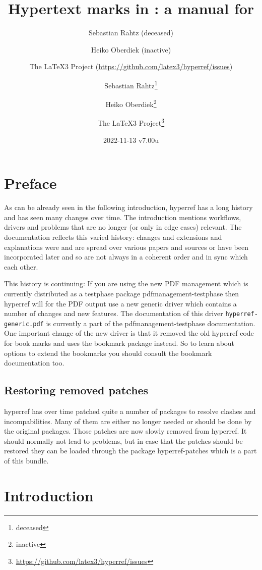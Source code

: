 \documentclass{article}
\author{Sebastian Rahtz (deceased)\and
       Heiko Oberdiek (inactive)\and
       The \LaTeX3 Project (\url{https://github.com/latex3/hyperref/issues})}
\author{Sebastian Rahtz\thanks{deceased}\and
       Heiko Oberdiek\thanks{inactive}\and
       The \LaTeX3 Project\thanks{\url{https://github.com/latex3/hyperref/issues}}}
\title{Hypertext marks in \hologo{LaTeX}: a manual for \xpackage{hyperref}}
\date{2022-11-13 v7.00u}
\newcommand*{\xpackage}[1]{\textsf{#1}}
\begin{document}
\thispagestyle{empty}
\maketitle
\tableofcontents
\setcounter{tocdepth}{2}%

\section{Preface}
As can be already seen in the following introduction, \xpackage{hyperref}
has a long history and has seen many changes over time. The introduction
mentions workflows, drivers and problems that are no longer (or only in edge cases) relevant.
The documentation reflects this varied history: changes
and extensions and explanations were and are spread over various papers and sources or
have been incorporated later and so are not always in a coherent order and in sync which each other.

This history is continuing: If you are using the new  PDF management
which is currently distributed as a testphase package \xpackage{pdfmanagement-testphase}
then \xpackage{hyperref} will for the PDF output use a new generic driver which
contains a number of changes and new features. The documentation of this driver
\texttt{hyperref-generic.pdf}
is currently a part of the \xpackage{pdfmanagement-testphase} documentation.
One important change of the new driver is
that it removed the old \xpackage{hyperref} code for book marks and uses
the \xpackage{bookmark} package instead. So to learn
about options to extend the bookmarks you should consult the \xpackage{bookmark} documentation
too.

\subsection{Restoring removed patches}

\xpackage{hyperref} has over time patched quite a number of packages to resolve clashes and incompabilities.
Many of them are either no longer needed or should be done by the original packages.
Those patches are now slowly removed from \xpackage{hyperref}.  It should normally not lead to problems, but
in case that the patches should be restored they can be loaded through the package \xpackage{hyperref-patches} which
is a part of this bundle.



\section{Introduction}
\end{document}
